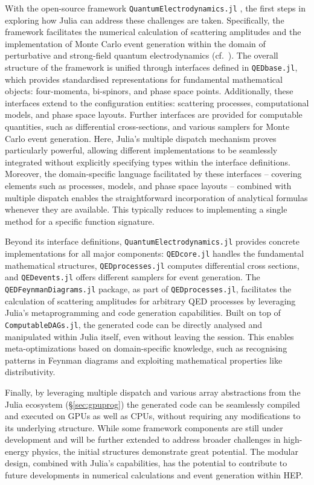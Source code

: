 \documentclass{webofc}
\begin{document}
With the open-source framework \texttt{QuantumElectrodynamics.jl}
\cite{qedjl-github}, the first steps in exploring how Julia
can address these challenges are taken. Specifically, the framework
facilitates the numerical calculation of scattering amplitudes and the
implementation of Monte Carlo event generation within the domain of perturbative
and strong-field quantum electrodynamics (cf.~\cite{Fedotov:2022ely}). The
overall structure of the framework is unified through interfaces defined in
\texttt{QEDbase.jl}, which provides standardised representations for fundamental
mathematical objects: four-momenta, bi-spinors, and phase space points.
Additionally, these interfaces extend to the configuration entities: 
scattering processes, computational models, and phase space layouts. Further
interfaces are provided for computable quantities, such as differential
cross-sections, and various samplers for Monte Carlo event generation. Here,
Julia’s multiple dispatch mechanism proves particularly powerful, allowing
different implementations to be seamlessly integrated without explicitly
specifying types within the interface definitions. Moreover, the domain-specific
language facilitated by these interfaces -- covering elements such as processes,
models, and phase space layouts -- combined with multiple dispatch enables the
straightforward incorporation of analytical formulas whenever they are
available. This typically reduces to implementing a single method for a specific
function signature.

Beyond its interface definitions, \texttt{QuantumElectrodynamics.jl} provides
concrete implementations for all major components: \texttt{QEDcore.jl} handles
the fundamental mathematical structures, \texttt{QEDprocesses.jl} computes
differential cross sections, and \texttt{QEDevents.jl} offers different samplers
for event generation. The \texttt{QEDFeynmanDiagrams.jl} package, as part of
\texttt{QEDprocesses.jl}, facilitates the calculation of scattering amplitudes
for arbitrary QED processes by leveraging Julia's metaprogramming and code
generation capabilities. Built on top of \texttt{ComputableDAGs.jl}, the
generated code can be directly analysed and manipulated within Julia itself,
even without leaving the session. This enables meta-optimizations based on
domain-specific knowledge, such as recognising patterns in Feynman diagrams and
exploiting mathematical properties like distributivity.

Finally, by leveraging multiple dispatch and various array abstractions from the
Julia ecosystem (\S\ref{sec:gpuprog}) the generated
code can be seamlessly compiled and executed on GPUs as well as CPUs,
without requiring any modifications to its underlying structure. While some
framework components are still under development and will be further extended to
address broader challenges in high-energy physics, the initial structures
demonstrate great potential. The modular design, combined with Julia's
capabilities, has the potential to contribute to future developments in
numerical calculations and event generation within HEP.
\end{document}
